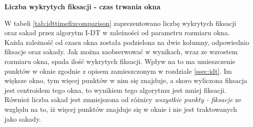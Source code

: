 \textbf{Liczba wykrytych fiksacji - czas trwania okna}\par
W tabeli \ref{tab:idttimefixcomparison} zaprezentowano liczbę wykrytych fiksacji oraz sakad przez algorytm I-DT w zależności od parametru rozmiaru okna. Każda zależność od czasu okna została podzielona na dwie kolumny, odpowiednio fiksacje oraz sakady. Jak można zaobserwować w wynikach, wraz ze wzrostem rozmiaru okna, spada ilość wykrytych fiksacji. Wpływ na to ma umieszczenie punktów w oknie zgodnie z opisem zamieszczonym w rozdziale \ref{ssec:idt}. Im większe okno, tym więcej punktów w nim się znajduje, a skoro wyliczona fiksacja jest centroidem tego okna, to wynikiem tego algorytmu jest mniej fiksacji. Również liczba sakad jest zmniejszona od różnicy \emph{wszystkie punkty - fiksacje} ze względu na to, iż więcej punktów znajduje się w oknie i nie jest traktowanych jako sakady.\par
